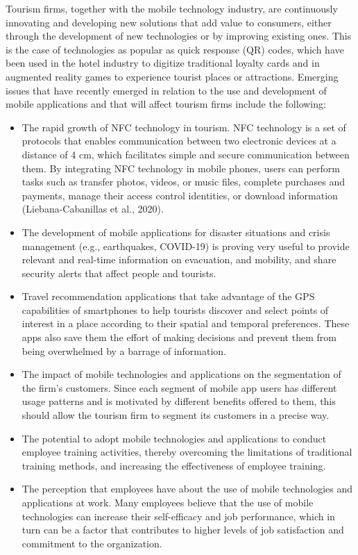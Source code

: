 \documentclass[
  letterpaper,
  DIV=11,
  numbers=noendperiod]{scrreprt}
\begin{document}
Tourism firms, together with the mobile technology industry, are
continuously innovating and developing new solutions that add value to
consumers, either through the development of new technologies or by
improving existing ones. This is the case of technologies as popular as
quick response (QR) codes, which have been used in the hotel industry to
digitize traditional loyalty cards and in augmented reality games to
experience tourist places or attractions. Emerging issues that have
recently emerged in relation to the use and development of mobile
applications and that will affect tourism firms include the following:

\begin{itemize}
\item
  The rapid growth of NFC technology in tourism. NFC technology is a set
  of protocols that enables communication between two electronic devices
  at a distance of 4 cm, which facilitates simple and secure
  communication between them. By integrating NFC technology in mobile
  phones, users can perform tasks such as transfer photos, videos, or
  music files, complete purchases and payments, manage their access
  control identities, or download information (Liebana-Cabanillas et
  al., 2020).
\item
  The development of mobile applications for disaster situations and
  crisis management (e.g., earthquakes, COVID-19) is proving very useful
  to provide relevant and real-time information on evacuation, and
  mobility, and share security alerts that affect people and tourists.
\item
  Travel recommendation applications that take advantage of the GPS
  capabilities of smartphones to help tourists discover and select
  points of interest in a place according to their spatial and temporal
  preferences. These apps also save them the effort of making decisions
  and prevent them from being overwhelmed by a barrage of information.
\item
  The impact of mobile technologies and applications on the segmentation
  of the firm's customers. Since each segment of mobile app users has
  different usage patterns and is motivated by different benefits
  offered to them, this should allow the tourism firm to segment its
  customers in a precise way.
\item
  The potential to adopt mobile technologies and applications to conduct
  employee training activities, thereby overcoming the limitations of
  traditional training methods, and increasing the effectiveness of
  employee training.
\item
  The perception that employees have about the use of mobile
  technologies and applications at work. Many employees believe that the
  use of mobile technologies can increase their self-efficacy and job
  performance, which in turn can be a factor that contributes to higher
  levels of job satisfaction and commitment to the organization.
\end{itemize}
\end{document}

